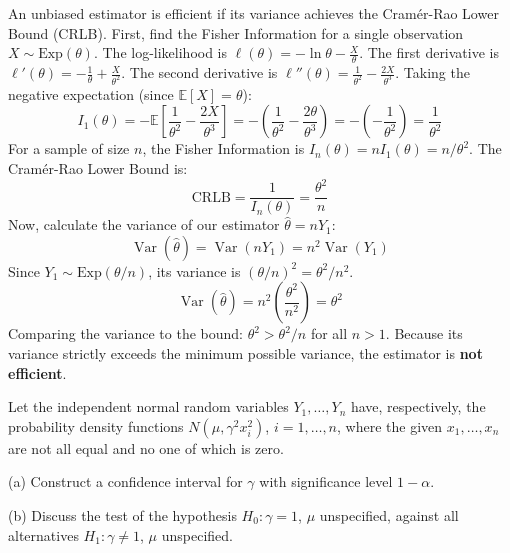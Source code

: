 \begin{solution}
An unbiased estimator is efficient if its variance achieves the Cramér-Rao Lower Bound (CRLB).
First, find the Fisher Information for a single observation $X \sim \text{Exp}(\theta)$.
The log-likelihood is $\ell(\theta) = -\ln \theta - \frac{X}{\theta}$.
The first derivative is $\ell'(\theta) = -\frac{1}{\theta} + \frac{X}{\theta^2}$.
The second derivative is $\ell''(\theta) = \frac{1}{\theta^2} - \frac{2X}{\theta^3}$.
Taking the negative expectation (since $\mathbb{E}[X] = \theta$):
\[ I_1(\theta) = -\mathbb{E}\left[ \frac{1}{\theta^2} - \frac{2X}{\theta^3} \right] = -\left( \frac{1}{\theta^2} - \frac{2\theta}{\theta^3} \right) = -\left( -\frac{1}{\theta^2} \right) = \frac{1}{\theta^2} \]
For a sample of size $n$, the Fisher Information is $I_n(\theta) = n I_1(\theta) = n/\theta^2$.
The Cramér-Rao Lower Bound is:
\[ \text{CRLB} = \frac{1}{I_n(\theta)} = \frac{\theta^2}{n} \]
Now, calculate the variance of our estimator $\hat{\theta} = n Y_1$:
\[ \operatorname{Var}(\hat{\theta}) = \operatorname{Var}(n Y_1) = n^2 \operatorname{Var}(Y_1) \]
Since $Y_1 \sim \text{Exp}(\theta/n)$, its variance is $(\theta/n)^2 = \theta^2/n^2$.
\[ \operatorname{Var}(\hat{\theta}) = n^2 \left( \frac{\theta^2}{n^2} \right) = \theta^2 \]
Comparing the variance to the bound: $\theta^2 > \theta^2/n$ for all $n > 1$.
Because its variance strictly exceeds the minimum possible variance, the estimator is \textbf{not efficient}.
\end{solution}

\begin{exercise}\label{probability:2015:5}
Let the independent normal random variables $Y_1, \dots, Y_n$ have, respectively, the probability density functions $N(\mu, \gamma^2 x_i^2)$, $i = 1, \ldots, n$, where the given $x_1, \ldots, x_n$ are not all equal and no one of which is zero.

(a) Construct a confidence interval for $\gamma$ with significance level $1-\alpha$.

(b) Discuss the test of the hypothesis $H_0: \gamma = 1$, $\mu$ unspecified, against all alternatives $H_1: \gamma \neq 1$, $\mu$ unspecified.
\end{exercise}

